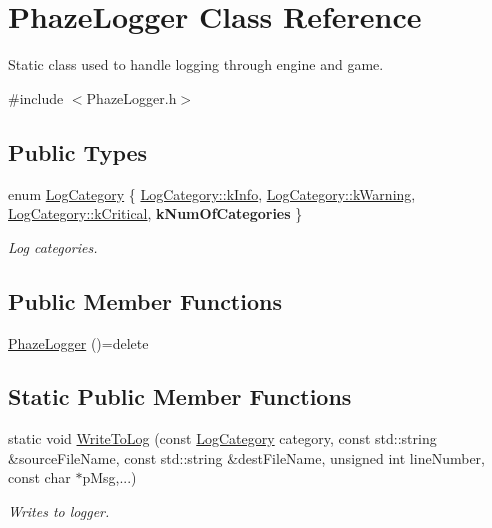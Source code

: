 \hypertarget{class_phaze_logger}{}\section{Phaze\+Logger Class Reference}
\label{class_phaze_logger}


Static class used to handle logging through engine and game.  




{\ttfamily \#include $<$Phaze\+Logger.\+h$>$}

\subsection*{Public Types}
\begin{DoxyCompactItemize}
\item 
enum \mbox{\hyperlink{class_phaze_logger_aa4b09b6a0ed29d067f86782aa369f6b0}{Log\+Category}} \{ \mbox{\hyperlink{class_phaze_logger_aa4b09b6a0ed29d067f86782aa369f6b0a176a473e63c17ccdac91640c67f149bf}{Log\+Category\+::k\+Info}}, 
\mbox{\hyperlink{class_phaze_logger_aa4b09b6a0ed29d067f86782aa369f6b0aec0da41f4e48b52c362303eb27ed5dee}{Log\+Category\+::k\+Warning}}, 
\mbox{\hyperlink{class_phaze_logger_aa4b09b6a0ed29d067f86782aa369f6b0a5a20548c220f372fc701cae6de94040b}{Log\+Category\+::k\+Critical}}, 
{\bfseries k\+Num\+Of\+Categories}
 \}
\begin{DoxyCompactList}\small\item\em Log categories. \end{DoxyCompactList}\end{DoxyCompactItemize}
\subsection*{Public Member Functions}
\begin{DoxyCompactItemize}
\item 
\mbox{\hyperlink{class_phaze_logger_ab57f5e5578fdba0eb6bddc4fae30b681}{Phaze\+Logger}} ()=delete
\end{DoxyCompactItemize}
\subsection*{Static Public Member Functions}
\begin{DoxyCompactItemize}
\item 
\mbox{\label{class_phaze_logger_aa6a0a46e3e5a56c449e2c657697d67e7}} 
static void \mbox{\hyperlink{class_phaze_logger_aa6a0a46e3e5a56c449e2c657697d67e7}{Write\+To\+Log}} (const \mbox{\hyperlink{class_phaze_logger_aa4b09b6a0ed29d067f86782aa369f6b0}{Log\+Category}} category, const std\+::string \&source\+File\+Name, const std\+::string \&dest\+File\+Name, unsigned int line\+Number, const char $\ast$p\+Msg,...)
\begin{DoxyCompactList}\small\item\em Writes to logger. \end{DoxyCompactList}\end{DoxyCompactItemize}


